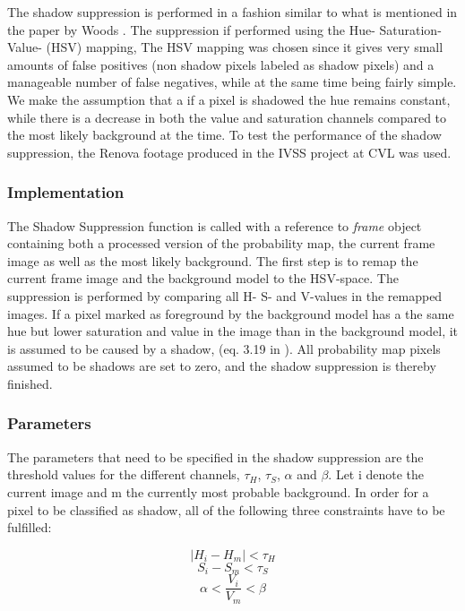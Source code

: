 The shadow suppression is performed in a fashion similar to what is mentioned in the paper by Woods \cite{Wood}. The suppression if performed using the Hue- Saturation- Value- (HSV) mapping, The HSV mapping was chosen since it gives very small amounts of false positives (non shadow pixels labeled as shadow pixels) and a manageable number of false negatives, while at the same time being fairly simple. We make the assumption that a if a pixel is shadowed the hue remains constant, while there is a decrease in both the value and saturation channels compared to the most likely background at the time. To test the performance of the shadow suppression, the Renova footage produced in the IVSS project at CVL was used. 


\subsubsection{Implementation}
The Shadow Suppression function is called with a reference to \emph{frame} object containing both a processed version of the probability map, the current frame image as well as the most likely background. The first step is to remap the current frame image and the background model to the HSV-space. The suppression is performed by comparing all H- S- and V-values in the remapped images. If a pixel marked as foreground by the background model has a the same hue but lower saturation and value in the image than in the background model, it is assumed to be caused by a shadow, (eq. 3.19 in \cite{Wood}). All probability map pixels assumed to be shadows are set to zero, and the shadow suppression is thereby finished.

\subsubsection{Parameters}
The parameters that need to be specified in the shadow suppression are the threshold values for the different channels, $\tau_H$, $\tau_S$, $\alpha$ and $\beta$. Let i denote the current image and m the currently most probable background. In order for a pixel to be classified as shadow, all of the following three constraints have to be fulfilled:

\begin{equation}
	|H_i - H_m| < \tau_H
	\label{eq:H}
\end{equation}
\begin{equation}
	S_i - S_m < \tau_S
	\label{eq:S}
\end{equation}
\begin{equation}
	\alpha < \frac{V_i}{V_m} < \beta
	\label{eq:V}
\end{equation}

